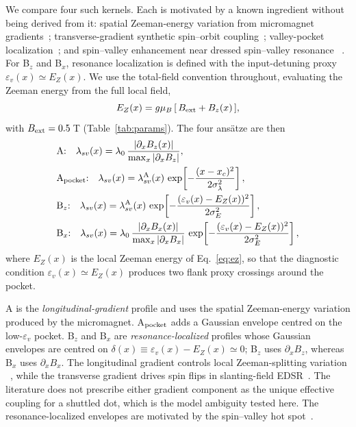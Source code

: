 \documentclass[aip,jap,reprint,superscriptaddress,longbibliography,floatfix]{revtex4-2}
\begin{document}
We compare four such kernels. Each is motivated by a known ingredient without
being derived from it: spatial Zeeman-energy variation from micromagnet
gradients~\cite{langrock_blueprint_2023,struck_low-frequency_2020};
transverse-gradient synthetic spin--orbit
coupling~\cite{borjans_single-spin_2019,zhang_controlling_2021,hosseinkhani_theory_2022};
valley-pocket
localization~\cite{paquelet_wuetz_atomic_2022,losert_strategies_2024,volmer_mapping_2024};
and spin--valley enhancement near dressed spin--valley resonance
~\cite{yang_spin-valley_2013,huang_spin_2014}. For B$_z$ and B$_x$,
resonance localization is defined with the input-detuning proxy
$\varepsilon_v(x)\simeq E_Z(x)$. We use the total-field convention throughout,
evaluating the Zeeman energy from the full local field,
%
\begin{equation}
E_Z(x) = g\mu_B\,[\,B_{\rm ext} + B_z(x)\,],
\label{eq:ez}
\end{equation}
%
with $B_{\rm ext}=0.5$\,T (Table~\ref{tab:params}). The four ans\"atze
are then
%
\begin{align}
& \text{A:} \quad \lambda_{sv}(x) = \lambda_0\,
  \frac{|\partial_x B_z(x)|}{\max_x|\partial_x B_z|}, \\
& \text{A}_{\rm pocket}\text{:} \quad \lambda_{sv}(x) = \lambda_{sv}^{\rm A}(x)\,
  \exp\!\left[-\frac{(x-x_c)^2}{2\sigma_\lambda^2}\right], \label{eq:ansatz_apocket} \\
& \text{B}_z\text{:} \quad \lambda_{sv}(x) = \lambda_{sv}^{\rm A}(x)\,
  \exp\!\left[-\frac{(\varepsilon_v(x)-E_Z(x))^2}{2\sigma_E^2}\right], \\
& \text{B}_x\text{:} \quad \lambda_{sv}(x) = \lambda_0\,
  \frac{|\partial_x B_x(x)|}{\max_x|\partial_x B_x|}\,
  \exp\!\left[-\frac{(\varepsilon_v(x)-E_Z(x))^2}{2\sigma_E^2}\right],
\end{align}
%
where $E_Z(x)$ is the local Zeeman energy of Eq.~\eqref{eq:ez}, so that
the diagnostic condition $\varepsilon_v(x)\simeq E_Z(x)$ produces two flank proxy
crossings
around the pocket.

A is the \emph{longitudinal-gradient} profile and uses the spatial
Zeeman-energy variation produced by the micromagnet. A$_{\rm pocket}$ adds a
Gaussian envelope centred on the low-$\varepsilon_v$ pocket. B$_z$ and B$_x$
are \emph{resonance-localized} profiles whose Gaussian envelopes are centred on
$\delta(x)\equiv\varepsilon_v(x)-E_Z(x)\simeq0$; B$_z$ uses
$\partial_x B_z$, whereas B$_x$ uses $\partial_x B_x$. The longitudinal
gradient controls local Zeeman-splitting variation
~\cite{langrock_blueprint_2023,struck_low-frequency_2020}, while the transverse
gradient drives spin flips in slanting-field
EDSR~\cite{tokura_coherent_2006,pioro-ladriere_electrically_2008,zhang_controlling_2021}.
The literature does not prescribe either gradient component as the unique
effective coupling for a shuttled dot, which is the model ambiguity tested
here. The resonance-localized envelopes are motivated by the spin--valley hot
spot~\cite{yang_spin-valley_2013,huang_spin_2014}.
\end{document}
